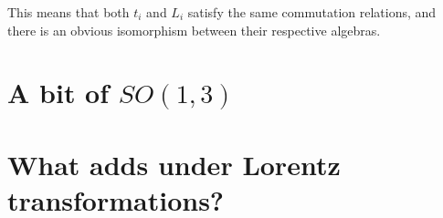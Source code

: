 \documentclass{article}
\begin{document}
This means that both $t_i$ and $L_i$ satisfy the same commutation relations, and there is an obvious isomorphism between their respective algebras.

\section{A bit of $SO(1,3)$}
\section{What adds under Lorentz transformations?}
\end{document}
